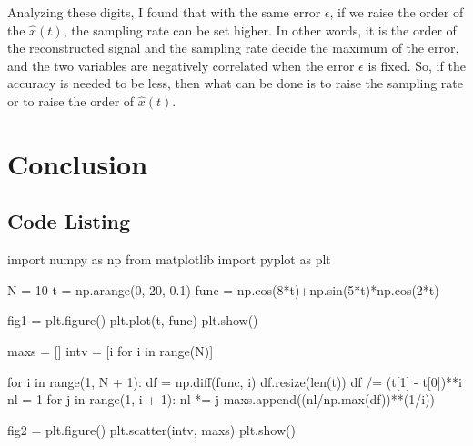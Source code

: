 \documentclass{article}
\begin{document}
Analyzing these digits, I found that with the same error $\epsilon$, if we raise the order of the $\hat{x}(t)$, the sampling rate can be set higher. In other words, it is the order of the reconstructed signal and the sampling rate decide the maximum of the error, and the two variables are negatively correlated when the error $\epsilon$ is fixed. So, if the accuracy is needed to be less, then what can be done is to raise the sampling rate or to raise the order of $\hat{x}(t)$.

\section{Conclusion}






\begin{appendices}
\section{Code Listing}
\begin{python}
import numpy as np
from matplotlib import pyplot as plt

N = 10
t = np.arange(0, 20, 0.1)
func = np.cos(8*t)+np.sin(5*t)*np.cos(2*t)

fig1 = plt.figure()
plt.plot(t, func)
plt.show()

maxs = []
intv = [i for i in range(N)]

for i in range(1, N + 1):
    df = np.diff(func, i)
    df.resize(len(t))
    df /= (t[1] - t[0])**i
    nl = 1
    for j in range(1, i + 1):
        nl *= j
    maxs.append((nl/np.max(df))**(1/i))

fig2 = plt.figure()
plt.scatter(intv, maxs)
plt.show()
\end{python}
\end{appendices}
\end{document}
